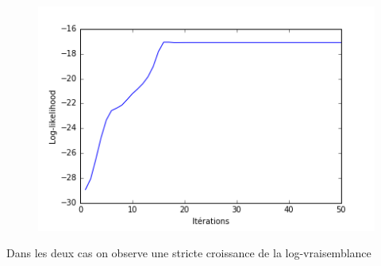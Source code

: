 \documentclass[10pt,a4paper]{article}
\begin{document}
\begin{figure}[H]
\centering
\includegraphics[scale=0.5]{../resources/pictures/M3_K2_fhmm_exact.png}
\end{figure}
Dans les deux cas on observe une stricte croissance de la log-vraisemblance
\end{document}
